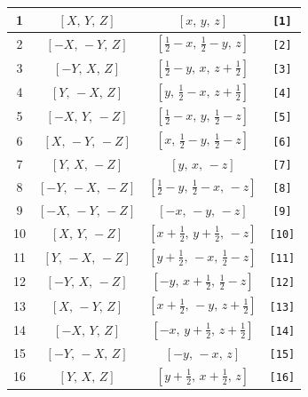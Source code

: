 \documentclass[fleqn,8pt]{jsarticle}
\begin{document}
\begin{longtable}{cccc}
1 & $\left[ X,\, Y,\, Z \right]$ & $\left[ x,\, y,\, z \right]$ & {\tt [1]} \\ \hline
2 & $\left[ - X,\, - Y,\, Z \right]$ & $\left[ \frac{1}{2} - x,\, \frac{1}{2} - y,\, z \right]$ & {\tt [2]} \\ \hline
3 & $\left[ - Y,\, X,\, Z \right]$ & $\left[ \frac{1}{2} - y,\, x,\, z + \frac{1}{2} \right]$ & {\tt [3]} \\ \hline
4 & $\left[ Y,\, - X,\, Z \right]$ & $\left[ y,\, \frac{1}{2} - x,\, z + \frac{1}{2} \right]$ & {\tt [4]} \\ \hline
5 & $\left[ - X,\, Y,\, - Z \right]$ & $\left[ \frac{1}{2} - x,\, y,\, \frac{1}{2} - z \right]$ & {\tt [5]} \\ \hline
6 & $\left[ X,\, - Y,\, - Z \right]$ & $\left[ x,\, \frac{1}{2} - y,\, \frac{1}{2} - z \right]$ & {\tt [6]} \\ \hline
7 & $\left[ Y,\, X,\, - Z \right]$ & $\left[ y,\, x,\, - z \right]$ & {\tt [7]} \\ \hline
8 & $\left[ - Y,\, - X,\, - Z \right]$ & $\left[ \frac{1}{2} - y,\, \frac{1}{2} - x,\, - z \right]$ & {\tt [8]} \\ \hline
9 & $\left[ - X,\, - Y,\, - Z \right]$ & $\left[ - x,\, - y,\, - z \right]$ & {\tt [9]} \\ \hline
10 & $\left[ X,\, Y,\, - Z \right]$ & $\left[ x + \frac{1}{2},\, y + \frac{1}{2},\, - z \right]$ & {\tt [10]} \\ \hline
11 & $\left[ Y,\, - X,\, - Z \right]$ & $\left[ y + \frac{1}{2},\, - x,\, \frac{1}{2} - z \right]$ & {\tt [11]} \\ \hline
12 & $\left[ - Y,\, X,\, - Z \right]$ & $\left[ - y,\, x + \frac{1}{2},\, \frac{1}{2} - z \right]$ & {\tt [12]} \\ \hline
13 & $\left[ X,\, - Y,\, Z \right]$ & $\left[ x + \frac{1}{2},\, - y,\, z + \frac{1}{2} \right]$ & {\tt [13]} \\ \hline
14 & $\left[ - X,\, Y,\, Z \right]$ & $\left[ - x,\, y + \frac{1}{2},\, z + \frac{1}{2} \right]$ & {\tt [14]} \\ \hline
15 & $\left[ - Y,\, - X,\, Z \right]$ & $\left[ - y,\, - x,\, z \right]$ & {\tt [15]} \\ \hline
16 & $\left[ Y,\, X,\, Z \right]$ & $\left[ y + \frac{1}{2},\, x + \frac{1}{2},\, z \right]$ & {\tt [16]} \\
\end{longtable}
\end{document}
